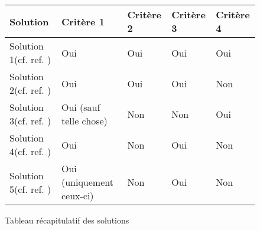 \begin{figure}[!h]
\begin{center}
\begin{tabular}{|l|l|l|l|l|}
  \hline
  Solution & Critère 1 & Critère 2 & Critère 3 & Critère 4\\
  \hline
  Solution 1(cf. ref. \cite{cite0}) & Oui & Oui & Oui & Oui \\
  Solution 2(cf. ref. \cite{cite1}) & Oui & Oui & Oui & Non \\
  Solution 3(cf. ref. \cite{cite2}) & Oui (sauf telle chose) & Non & Non & Oui\\
  Solution 4(cf. ref. \cite{cite3}) & Oui& Non & Oui & Non\\
  Solution 5(cf. ref. \cite{cite4}) & Oui (uniquement ceux-ci) & Non & Oui & Non\\
  \hline
\end{tabular}
\end{center}
\caption{Tableau récapitulatif des solutions}
\end{figure}
\fi
